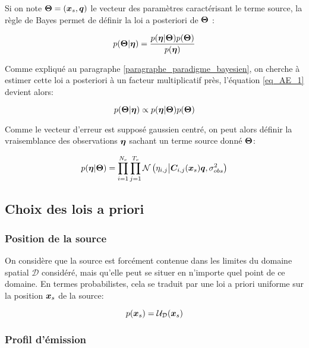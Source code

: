 Si on note ${\bm{\Theta}} = ({\bm{x}_s}, {\bm{q}})$ le vecteur des paramètres caractérisant le terme source, la règle de Bayes permet {de définir} la loi a posteriori de ${\bm{\Theta}}$ : 

\begin{equation}
p({\bm{\Theta}} | {\bm{\eta}}) = \dfrac{p({\bm{\eta}} | {\bm{\Theta}})p({\bm{\Theta}})}{p({\bm{\eta}})}
\label{eq_AE_1}
\end{equation}

Comme expliqué au paragraphe \ref{paragraphe_paradigme_bayesien}, on cherche à estimer cette loi a posteriori à un facteur multiplicatif près, l'équation \eqref{eq_AE_1} devient alors:

\begin{equation}
{
p({\bm{\Theta}}| {\bm{\eta}}) \propto p({\bm{\eta}}| {\bm{\Theta}})p({\bm{\Theta}})
}
\label{eq_AE_1_prop}
\end{equation}

Comme {le vecteur d'erreur est supposé gaussien centré}, on peut alors définir la vraisemblance des observations ${\bm{\eta}}$ sachant un terme source donné ${\bm{\Theta}}$:

\begin{equation}
p({\bm{\eta}} | {\bm{\Theta}}) = \prod\limits_{i=1}^{N_c} \prod\limits_{j=1}^{T_c}\mathcal{N}\left({\eta}_{i,j} \middle\vert {\bm{C}}_{i,j}({\bm{x}_s}){\bm{q}}, {\sigma_{obs}^2}\right)
\label{eq_AE_5}
\end{equation}

\subsection{Choix des lois a priori}

\subsubsection{Position de la source}

On considère que la source est forcément contenue dans les limites du domaine spatial $\mathcal{D}$ considéré, mais qu'elle peut se situer en n'importe quel point de ce domaine. En termes probabilistes, cela se traduit par une loi a priori uniforme sur la position ${\bm{x}_s}$ de la source:

\begin{equation}
p({\bm{x}_s}) = \mathcal{U}_\mathcal{D}({\bm{x}_s})
\label{eq_AE_7}
\end{equation}


\subsubsection{Profil d'émission}


